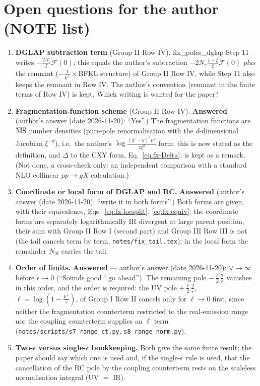 \documentclass[9pt]{article}
\numberwithin{equation}{section}
\begin{document}
{\color{red}
\section{Open questions for the author (NOTE list)}
\begin{enumerate}
\item \textbf{DGLAP subtraction term} (Group II Row IV). fix\_poles\_dglap Step 11 writes $-\frac{2N_{c}}{\xi}\mathcal{F}(0)$; this equals the author's subtraction $-2N_{c}\frac{1-\xi}{\xi}\mathcal{F}(0)$ \emph{plus} the remnant ($-\frac{1}{k^{+}}\times$BFKL structure) of Group II Row IV, while Step 11 also keeps the remnant in Row IV. The author's convention (remnant in the finite terms of Row IV) is kept. Which writing is wanted for the paper?
\item \textbf{Fragmentation-function scheme} (Group II Row IV). \textbf{Answered} (author's answer (date 2026-11-20): ``Yes''.) The fragmentation functions are $\overline{\rm MS}$ number densities (pure-pole renormalisation with the $d$-dimensional Jacobian $\xi^{-d}$), i.e.\ the author's $\log\frac{(y'-y)^{2}\mu^{2}}{4\xi^{2}}$ form; this is now stated as the definition, and $\Delta$ to the CXY form, Eq.~\eqref{eq:fx-Delta}, is kept as a remark. (Not done, a cross-check only: an independent comparison with a standard NLO collinear $pp\to gX$ calculation.)
\item \textbf{Coordinate or local form of DGLAP and RC.} \textbf{Answered} (author's answer (date 2026-11-20): ``write it in both forms''.) Both forms are given, with their equivalence, Eqs.~\eqref{eq:fx-locsplit}, \eqref{eq:fx-equiv}: the coordinate forms are separately logarithmically IR divergent at large parent position, their sum with Group II Row I (second part) and Group III Row III is not (the tail cancels term by term, \texttt{notes/fix\_tail.tex}); in the local form the remainder $N_{\mathcal{R}}$ carries the tail.
\item \textbf{Order of limits.} \textbf{Answered} --- author's answer (date 2026-11-20): $\vee\to\infty$ before $\epsilon\to0$ (``Sounds good ! go ahead''). The remaining pole $-\frac{\ell}{2}\frac{2}{\epsilon}$ vanishes in this order, and the order is required: the UV pole $+\frac{\ell}{2}\frac{2}{\epsilon}$, $\ell=\log(1-\frac{k^{+}}{\vee})$, of Group I Row II cancels only for $\ell\to0$ first, since neither the fragmentation counterterm restricted to the real-emission range nor the coupling counterterm supplies an $\ell$ term (\texttt{notes/scripts/s7\_range\_ct.py}, \texttt{s8\_range\_norm.py}).
\item \textbf{Two-$\epsilon$ versus single-$\epsilon$ bookkeeping.} Both give the same finite result; the paper should say which one is used and, if the single-$\epsilon$ rule is used, that the cancellation of the RC pole by the coupling counterterm rests on the scaleless normalisation integral (UV $=$ IR).
\end{enumerate}}\par
\end{document}
